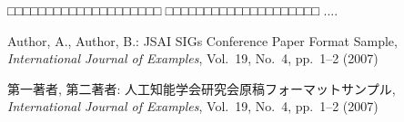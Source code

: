 \documentclass[a4j]{jarticle}
\begin{document}
□□□□□□□□□□□□□□□□□□□□
□□□□□□□□□□□□□□□□□□□□
....


\begin{thebibliography}{99}

Author, A., Author, B.:
JSAI SIGs Conference Paper Format Sample,
{\it International Journal of Examples}, Vol.~19, No.~4, pp.~1--2 (2007)

第一著者, 第二著者:
人工知能学会研究会原稿フォーマットサンプル,
{\it International Journal of Examples}, Vol.~19, No.~4, pp.~1--2 (2007)

\end{thebibliography}
\end{document}
